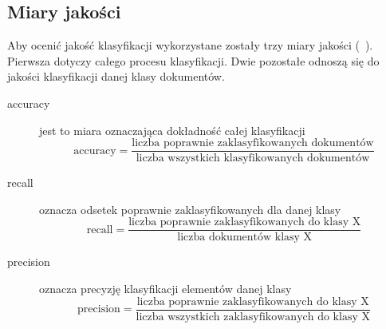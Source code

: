 \documentclass{classrep}
\begin{document}
{        \subsection{Miary jakości} \label{jakosc} {
            Aby ocenić jakość klasyfikacji wykorzystane zostały trzy miary
            jakości (~\cite{quality}). Pierwsza dotyczy całego procesu
            klasyfikacji. Dwie pozostałe odnoszą się do jakości klasyfikacji
            danej klasy dokumentów.
            \begin{description}
                \item[accuracy] jest to miara oznaczająca dokładność całej klasyfikacji
                \begin{equation}
                    \textrm{accuracy} = \frac{\textrm{liczba poprawnie zaklasyfikowanych dokumentów}}{\textrm{liczba wszystkich klasyfikowanych dokumentów}}
                \end{equation}
                \item[recall] oznacza odsetek poprawnie zaklasyfikowanych dla danej klasy
                \begin{equation}
                    \textrm{recall} = \frac{\textrm{liczba poprawnie zaklasyfikowanych do klasy X}}{\textrm{liczba dokumentów klasy X}}
                \end{equation}
                \item[precision] oznacza precyzję klasyfikacji elementów danej klasy
                \begin{equation}
                    \textrm{precision} = \frac{\textrm{liczba poprawnie zaklasyfikowanych do klasy X}}{\textrm{liczba wszystkich zaklasyfikowanych do klasy X}}
                \end{equation}
            \end{description}
        }
    }
\end{document}
